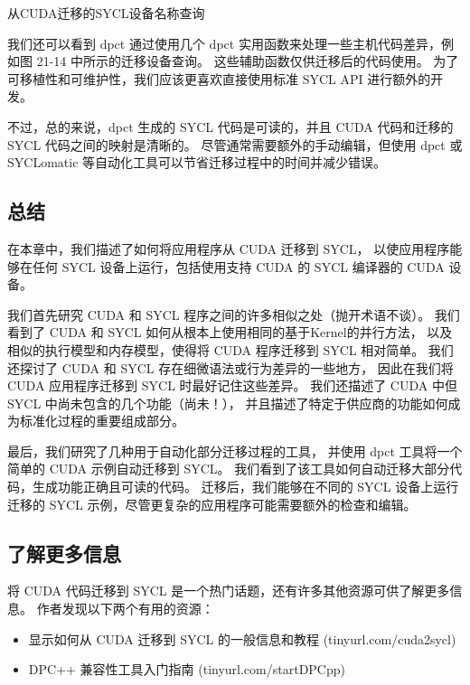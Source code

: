 {\color{red} 从CUDA迁移的SYCL设备名称查询}

我们还可以看到 dpct 通过使用几个 dpct 实用函数来处理一些主机代码差异，例如图 21-14 中所示的迁移设备查询。 
这些辅助函数仅供迁移后的代码使用。 为了可移植性和可维护性，我们应该更喜欢直接使用标准 SYCL API 进行额外的开发。

不过，总的来说，dpct 生成的 SYCL 代码是可读的，并且 CUDA 代码和迁移的 SYCL 代码之间的映射是清晰的。 
尽管通常需要额外的手动编辑，但使用 dpct 或 SYCLomatic 等自动化工具可以节省迁移过程中的时间并减少错误。

\subsection{总结}
在本章中，我们描述了如何将应用程序从 CUDA 迁移到 SYCL，
以使应用程序能够在任何 SYCL 设备上运行，包括使用支持 CUDA 的 SYCL 编译器的 CUDA 设备。

我们首先研究 CUDA 和 SYCL 程序之间的许多相似之处（抛开术语不谈）。 
我们看到了 CUDA 和 SYCL 如何从根本上使用相同的基于Kernel的并行方法，
以及相似的执行模型和内存模型，使得将 CUDA 程序迁移到 SYCL 相对简单。 
我们还探讨了 CUDA 和 SYCL 存在细微语法或行为差异的一些地方，
因此在我们将 CUDA 应用程序迁移到 SYCL 时最好记住这些差异。 
我们还描述了 CUDA 中但 SYCL 中尚未包含的几个功能（尚未！），
并且描述了特定于供应商的功能如何成为标准化过程的重要组成部分。

最后，我们研究了几种用于自动化部分迁移过程的工具，
并使用 dpct 工具将一个简单的 CUDA 示例自动迁移到 SYCL。 
我们看到了该工具如何自动迁移大部分代码，生成功能正确且可读的代码。 
迁移后，我们能够在不同的 SYCL 设备上运行迁移的 SYCL 示例，尽管更复杂的应用程序可能需要额外的检查和编辑。

\subsection{了解更多信息}
将 CUDA 代码迁移到 SYCL 是一个热门话题，还有许多其他资源可供了解更多信息。 作者发现以下两个有用的资源：

\begin{itemize}
	\item 显示如何从 CUDA 迁移到 SYCL 的一般信息和教程 (tinyurl.com/cuda2sycl)

	\item DPC++ 兼容性工具入门指南 (tinyurl.com/startDPCpp)
\end{itemize}
